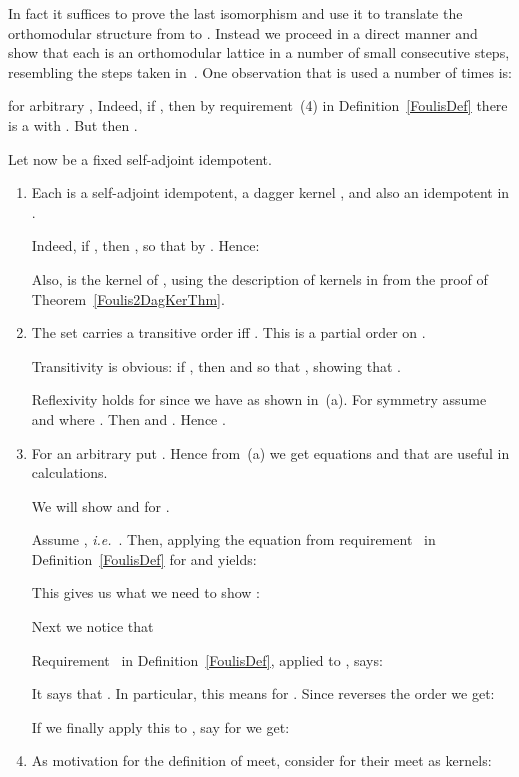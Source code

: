 \documentclass{article}
\newenvironment{proof}[1][Proof]{ \begin{trivlist}\item[\hskip \labelsep {\bfseries #1}]}{ \end{trivlist}}
\begin{document}
\begin{proof}
In fact it suffices to prove the last isomorphism  and use it to translate the orthomodular structure from
 to . Instead we proceed in a direct manner and show
that each  is an orthomodular lattice in a number of small
consecutive steps, resembling the steps taken in~\cite[Chapter~5,
  \S\S18]{Kalmbach83}. One observation that is used a number of times
is:


\noindent for arbitrary , Indeed, if , then by
requirement~(4) in Definition~\ref{FoulisDef} there is a  with
. But then .

Let  now be a fixed self-adjoint idempotent. 
\begin{enumerate}
\renewcommand{\theenumi}{(\alph{enumi})}
\item Each  is a self-adjoint idempotent, a dagger kernel
, and also an idempotent 
in .

Indeed, if , then , so that  by . 
Hence:


\noindent Also,  is the kernel of , using the description of kernels in
 from the proof of Theorem~\ref{Foulis2DagKerThm}.

\item The set  carries a transitive order  iff
. This  is a partial order on .

Transitivity is obvious: if , then  and
 so that ,
showing that .

Reflexivity  holds for  since we have  as shown in~(a). For symmetry assume  and 
where . Then  and . Hence .

\item For an arbitrary  put . Hence from~(a) we get equations  and  that are useful in calculations.

We will show 
and  for .

Assume , \textit{i.e.}~. Then, applying the
equation  from
requirement~ in Definition~\ref{FoulisDef} for  and  yields:


\noindent This gives us what we need to show :


Next we notice that 


\noindent Requirement~ in Definition~\ref{FoulisDef}, applied to , 
says:


\noindent It says that . In particular,
this means  for . Since 
reverses the order we get:


\noindent If we finally apply this to , say for
 we get:


\item As motivation for the definition of meet, consider for  their meet as kernels:



\end{enumerate}
\end{proof}
\end{document}
